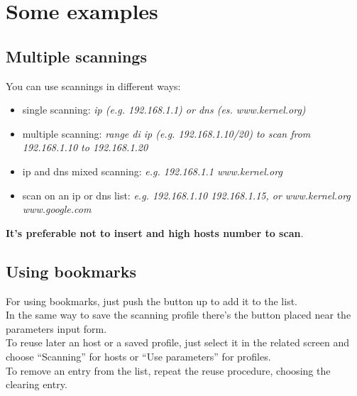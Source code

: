 \chapter{Some examples}
\label{ch:Examples}

\section{Multiple scannings}
\label{sec:ExamplesMultipleScan}

You can use scannings in different ways:
\begin{itemize}
\item single scanning: \emph{ip (e.g. 192.168.1.1) or dns (es. www.kernel.org)}
\item multiple scanning: \emph{range di ip (e.g. 192.168.1.10/20) to scan from
  192.168.1.10 to 192.168.1.20}
\item ip and dns mixed scanning: \emph{e.g. 192.168.1.1 www.kernel.org}
\item scan on an ip or dns list: \emph{e.g. 192.168.1.10 192.168.1.15,
  or www.kernel.org www.google.com}
\end{itemize}
\textbf{It's preferable not to insert and high hosts number to scan}.

\section{Using bookmarks}
\label{sec:ExamplesUseBookmarks}

For using bookmarks, just push the button up to add it to the list.\\
In the same way to save the scanning profile there's the button placed near 
the parameters input form.\\
To reuse later an host or a saved profile, just select it in the related 
screen and choose ``Scanning'' for hosts or ``Use parameters'' for profiles.\\
To remove an entry from the list, repeat the reuse procedure, choosing the 
clearing entry.
